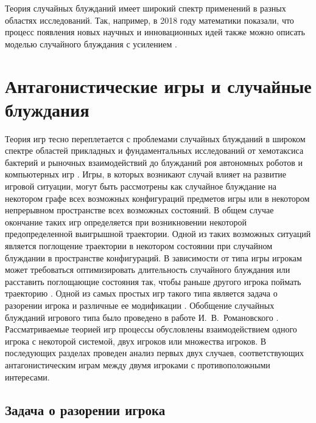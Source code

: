 Теория случайных блужданий имеет широкий спектр применений в разных областях исследований. Так, например, в 2018 году математики показали, что процесс появления новых научных и инновационных идей также можно описать моделью случайного блуждания с усилением \cite{iacopini_network_2018}.

\section{Антагонистические игры и случайные блуждания}\label{sec:ch1/sec3}

Теория игр тесно переплетается с проблемами случайных блужданий в широком спектре областей прикладных и фундаментальных исследований от хемотаксиса бактерий \cite{zaburdaev_levy_2015,bib1,bib2} и рыночных взаимодействий \cite{li_evolutionary_2013,friedman_towards_2001} до блужданий роя автономных роботов \cite{marques_particle_2006,xiong_intelligent_2008} и компьютерных игр \cite{outlaw_markov_2016,dankel_long_2004,dshalalow_random_2008}. Игры, в которых возникают случай влияет на развитие игровой ситуации, могут быть рассмотрены как случайное блуждание на некотором графе всех возможных конфигураций предметов игры или в некотором непрерывном пространстве всех возможных состояний. В общем случае окончание таких игр определяется при возникновении некоторой предопределенной выигрышной траектории. Одной из таких возможных ситуаций является поглощение траектории в некотором состоянии при случайном блуждании в пространстве конфигураций. В зависимости от типа игры игрокам может требоваться оптимизировать длительность случайного блуждания или расставить поглощающие состояния так, чтобы раньше другого игрока поймать траекторию \cite{baldi_intransitiveness_2020}. Одной из самых простых игр такого типа является задача о разорении игрока \cite{feller_introduction_1968} и различные ее модификации \cite{baldi_intransitiveness_2020,cencetti_second_2016,kittas_trapping_2008,lee_random-walk_1989}. Обобщение случайных блужданий игрового типа было проведено в работе И.~В.~Романовского \cite{romanovsky_1961}. Рассматриваемые теорией игр процессы обусловлены взаимодействием одного игрока с некоторой системой, двух игроков или множества игроков. В последующих разделах проведен анализ первых двух случаев, соответствующих антагонистическим играм между двумя игроками с противоположными интересами.

\subsection{Задача о разорении игрока}\label{subsec:ch1/sec3/sub1}

